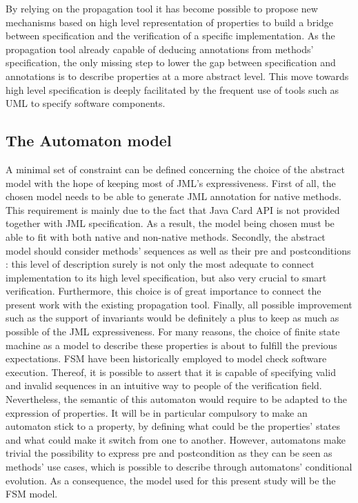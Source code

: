 By relying on the propagation tool it has become possible to propose new mechanisms based on high level representation of properties to build a bridge between specification and the verification of a specific implementation. As the propagation tool already capable of deducing annotations from methods' specification, the only missing step to lower the gap between specification and annotations is to describe properties at a more abstract level. This move towards high level specification is deeply facilitated by the frequent use of tools such as UML to specify software components.

\subsection{The Automaton model}
A minimal set of constraint can be defined concerning the choice of the abstract model with the hope of keeping most of JML's expressiveness. First of all, the chosen model needs to be able to generate JML annotation for native methods. This requirement is mainly due to the fact that Java Card API is not provided together with JML specification. As a result, the model being chosen must be able to fit with both native and non-native methods. Secondly, the abstract model should consider methods' sequences as well as their pre and postconditions : this level of description surely is not only the most adequate to connect implementation to its high level specification, but also very crucial to smart verification. Furthermore, this choice is of great importance to connect the present work with the existing propagation tool. Finally, all possible improvement such as the support of invariants would be definitely a plus to keep as much as possible of the JML expressiveness.
For many reasons, the choice of finite state machine as a model to describe these properties is about to fulfill the previous expectations. FSM have been historically employed to model check software execution. Thereof, it is possible to assert that it is capable of specifying valid and invalid sequences in an intuitive way to people of the verification field. Nevertheless, the semantic of this automaton would require to be adapted to the expression of properties. It will be in particular compulsory to make an automaton stick to a property, by defining what could be the properties' states and what could make it switch from one to another. However, automatons make trivial the possibility to express pre and postcondition as they can be seen as methods' use cases, which is possible to describe through automatons' conditional evolution. As a consequence, the model used for this present study will be the FSM model.

